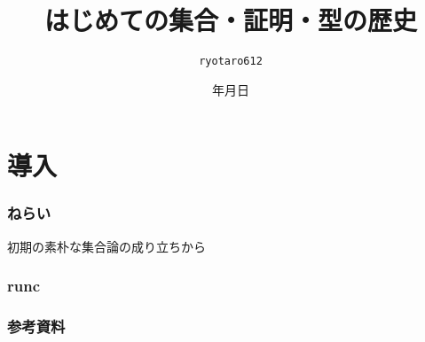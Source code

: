 \documentclass[unicode, 14pt, aspectratio=169]{beamer}
\date{\number\year 年\number\month 月\number\day 日}
\title{はじめての集合・証明・型の歴史}
\author{\texttt{ryotaro612}}
\begin{document}
\begin{frame}
\titlepage
\end{frame}
\section{導入}
\begin{frame}
  \frametitle{ねらい}
  初期の素朴な集合論の成り立ちから
\end{frame}
  
\begin{frame}[t]
  \frametitle{runc}
\end{frame}
\begin{frame}[allowframebreaks,t]
  \frametitle{参考資料}  
  \printbibliography
\end{frame}
\end{document}
